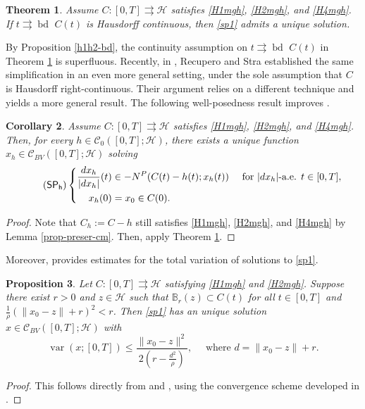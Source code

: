 \documentclass[preprint,12pt]{elsarticle}
\renewcommand{\H}{\mathcal{H}}
\newcommand{\tto}{\rightrightarrows}
\newcommand{\bd}{{\operatorname{bd \ }}}
\theoremstyle{plain}
\newtheorem{theorem}{Theorem}[section]
\newtheorem{proposition}[theorem]{Proposition}
\newtheorem{corollary}[theorem]{Corollary}
\theoremstyle{definition}
\theoremstyle{remark}
\begin{document}
\begin{theorem}\label{mc-thm}
Assume $C\colon [0,T]\tto \H$ satisfies \ref{H1mgh}, \ref{H2mgh}, and \ref{H4mgh}. If $t\tto\bd C(t)$ is Hausdorff continuous, then \eqref{sp1} admits a unique solution.
\end{theorem}
By Proposition \ref{h1h2-bd}, the continuity assumption on $t\tto \bd C(t)$ in Theorem \ref{mc-thm} is superfluous. Recently, in \cite{recupero_stra_2025_excess}, Recupero and Stra established the same simplification in an even more general setting, under the sole assumption that \(C\) is Hausdorff right-continuous. Their argument relies on a different technique and yields a more general result. The following well-posedness result improves \cite[Theorem 4.2]{MR1946545}.
	\begin{corollary}\label{mc-ch-cor}
Assume $C\colon [0,T]\tto \H$ satisfies \ref{H1mgh}, \ref{H2mgh},  and \ref{H4mgh}. Then, for every $h\in \mathcal{C}_0([0,T];\H)$, there exists a  unique function $x_h\in \mathcal{C}_{BV}([0,T];\H)$ solving
\begin{equation}\tag{$\mathsf{SP_h}$}\label{sp1h}
\left\{
\begin{aligned}
\frac{dx_h}{|dx_h|}(t)&\in -N^P(C(t)-h(t);x_h(t)) & \textrm{ for } |dx_h|\textrm{-a.e. } t\in [0,T],\\
				x_h(0)&=x_0\in C(0).
\end{aligned}
\right.
\end{equation}
\end{corollary}
\begin{proof} Note that $C_h := C-h$ still satisfies \ref{H1mgh}, \ref{H2mgh}, and \ref{H4mgh} by Lemma \ref{prop-preser-cm}. Then, apply Theorem \ref{mc-thm}.
	\end{proof}
    
Moreover, \cite{MR1946545} provides estimates for the total variation of solutions to \eqref{sp1}.
	\begin{proposition}\label{prop_var_cm}
Let $C\colon [0,T]\tto \H$ satisfying \ref{H1mgh} and \ref{H2mgh}. Suppose there exist $r>0$ and $z\in\H$ such that $\mathbb{B}_{r}(z)\subset C(t)$ for all $t\in [0,T]$ and $\frac{1}{\rho}(\|x_0 - z\|+r)^2< r$. Then \eqref{sp1} has an unique solution $x\in \mathcal{C}_{BV}([0,T];\H)$  with
\begin{equation*}
\operatorname{var}(x;[0,T])\leq \frac{\|x_0-z\|^2}{2(r- \frac{d^2}{\rho})}, \quad  \textrm{ where } d = \|x_0-z\| + r.
\end{equation*}
	\end{proposition}
    \begin{proof}
This follows directly from \cite[Lemma 2.2]{MR1946545} and \cite[Theorem 0.2.1]{MR1231975}, using the convergence scheme developed in \cite[Theorem 4.1]{MR1946545}. 
    \end{proof}
    
\end{document}
